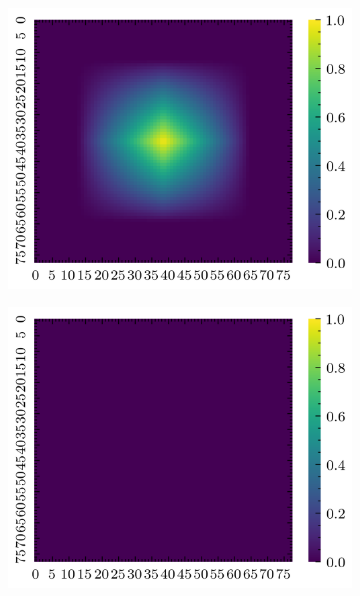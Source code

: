 \begin{figure}[H]
\begin{subfigure}[b]{0.19\textwidth}
        \includegraphics[width=\linewidth]{../img/5/quarry/best/grad-cam-2d-2.png}
    \end{subfigure}
    \begin{subfigure}[b]{0.19\textwidth}
        \includegraphics[width=\linewidth]{../img/5/quarry/best/grad-cam-2d-3.png}
    \end{subfigure}  
    \begin{subfigure}[b]{0.19\textwidth}

\end{subfigure}
\end{figure}
